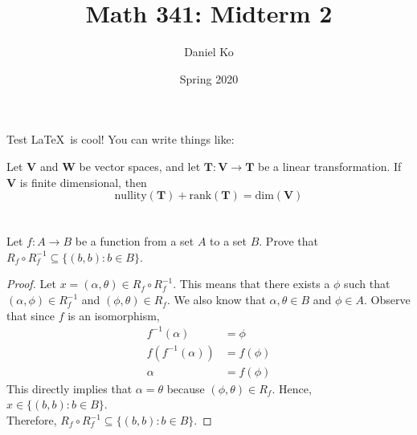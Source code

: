 \documentclass[11pt]{scrartcl}
\title{Math 341: Midterm 2}
\author{Daniel Ko}
\date{Spring 2020}
\begin{document}
\maketitle

\section{}
Test
\LaTeX \ is cool! You can write things like:
\begin{theorem*}
	Let \textbf{V} and \textbf{W} be vector spaces, and let 
	$\mathbf{T}: \mathbf{V} \rightarrow \mathbf{T}$ be a linear transformation.
	If $\mathbf{V}$ is finite dimensional, then
	$$\text{nullity}(\mathbf{T}) + \text{rank}(\mathbf{T}) = \text{dim}(\mathbf{V})$$
	
\end{theorem*}

\section{}
Let $f: A \rightarrow B$ be a function from a set $A$ to a set $B$. Prove that
$R_{f} \circ R_{f}^{-1} \subseteq\{(b, b): b \in B\}$.

\begin{proof}
	Let $x = (\alpha,\theta) \in R_{f} \circ R_{f}^{-1}$. This means that there exists a $\phi$ such that
	$(\alpha,\phi) \in R_{f}^{-1}$ and $(\phi,\theta) \in R_{f}$. We also know that $\alpha,\theta \in B$ and $\phi \in A$.
	Observe that since $f$ is an isomorphism,
	\begin{align*}
		f^{-1} (\alpha)     & = \phi    \\
		f (f^{-1} (\alpha)) & = f(\phi) \\
		\alpha              & = f(\phi)
	\end{align*}
	This directly implies that $\alpha = \theta$ because $(\phi,\theta) \in R_{f}$. Hence, $x \in \{(b, b): b \in B\}$.\\
	Therefore, $R_{f} \circ R_{f}^{-1} \subseteq\{(b, b): b \in B\}$.
\end{proof}


\end{document}
